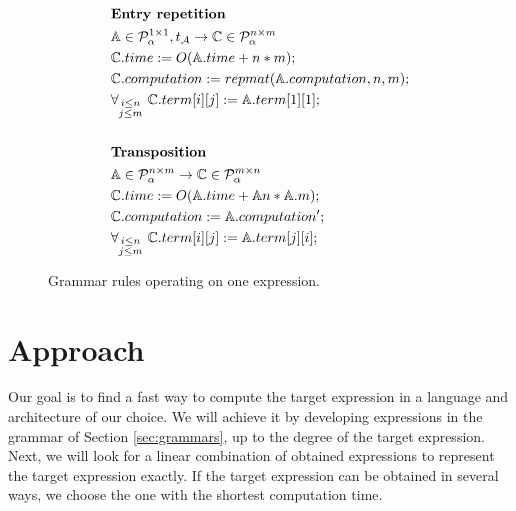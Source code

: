 \begin{figure}
\begin{framed}
\begin{align*}
& \\
&\text{{\bf Entry repetition}}\\
&\mathbb{A} \in \mathcal{P}^{1 \times 1}_\alpha, t_\mathcal{A} \rightarrow \mathbb{C} \in \mathcal{P}^{n \times m}_\alpha \\
&\mathbb{C}.time := O(\mathbb{A}.time + n * m);\\
&\mathbb{C}.computation := repmat(\mathbb{A}.computation, n, m); \\
&\forall_{\substack{i \leq n\\ j \leq m}}\text{ } \mathbb{C}.term[i][j] := \mathbb{A}.term[1][1];\\
& \\
&\text{{\bf Transposition}}\\
&\mathbb{A} \in \mathcal{P}^{n \times m}_\alpha \rightarrow \mathbb{C} \in \mathcal{P}^{m \times n}_\alpha\\
&\mathbb{C}.time := O(\mathbb{A}.time + \mathbb{A}n * \mathbb{A}.m);\\
&\mathbb{C}.computation := \mathbb{A}.computation';\\
&\forall_{\substack{i \leq n\\j \leq m}}\text{ } \mathbb{C}.term[i][j] := \mathbb{A}.term[j][i];
\end{align*}
\caption{Grammar rules operating on one expression.}
\label{fig:rules}
\end{framed}
\end{figure}

\section{Approach}\label{sec:admissible}

Our goal is to find a fast way to compute the target expression in
a language and architecture of our choice. We will achieve it by
developing expressions in the grammar of Section \ref{sec:grammars}, up to the degree of the target
expression. Next, we will look for a linear combination of obtained
expressions to represent the target expression exactly. If the target expression
can be obtained in several ways, we choose the one with the shortest
computation time.

